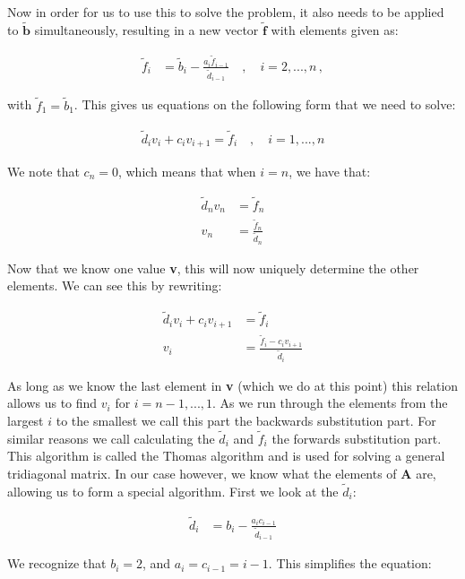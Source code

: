 \documentclass[english,notitlepage,reprint,nofootinbib]{revtex4-1}  %
\begin{document}
Now in order for us to use this to solve the problem, it also needs to be applied to $\tilde{\textbf{b}}$ simultaneously, resulting in a new vector $\tilde{\textbf{f}}$ with elements given as:

\begin{align*}
\tilde{f}_i &= \tilde{b}_i - \frac{a_i \tilde{f}_{i-1}}{\tilde{d}_{i-1}} \quad , \quad i = 2,...,n \, ,
\end{align*}

with $\tilde{f}_1 = \tilde{b}_1$. This gives us equations on the following form that we need to solve:

\begin{align*}
\tilde{d}_i v_i  + c_i v_{i+1} = \tilde{f}_i \quad , \quad i = 1,...,n
\end{align*}

We note that $c_n = 0$, which means that when $i=n$, we have that:

\begin{align*}
\tilde{d}_n v_n &= \tilde{f}_n \\
v_n &= \frac{\tilde{f}_n}{\tilde{d}_n}
\end{align*}

Now that we know one value \textbf{v}, this will now uniquely determine the other elements. We can see this by rewriting:

\begin{align*}
\tilde{d}_i v_i  + c_i v_{i+1} &= \tilde{f}_i \\
v_i &= \frac{\tilde{f}_i - c_i v_{i+1}}{\tilde{d}_i}
\end{align*}

As long as we know the last element in \textbf{v} (which we do at this point) this relation allows us to find $v_i$ for $i = n-1,...,1$. As we run through the elements from the largest $i$ to the smallest we call this part the backwards substitution part. For similar reasons we call calculating the $\tilde{d}_i$ and $\tilde{f}_i$ the forwards substitution part. This algorithm is called the Thomas algorithm \citep{Thomas1949} and is used for solving a general tridiagonal matrix. In our case however, we know what the elements of \textbf{A} are, allowing us to form a special algorithm. First we look at the $\tilde{d}_i$:

\begin{align*}
\tilde{d}_i &= b_i - \frac{a_i c_{i-1}}{\tilde{d}_{i-1}}
\end{align*}

We recognize that $b_i = 2$, and $a_i = c_{i-1} = i-1$. This simplifies the equation:
\end{document}

